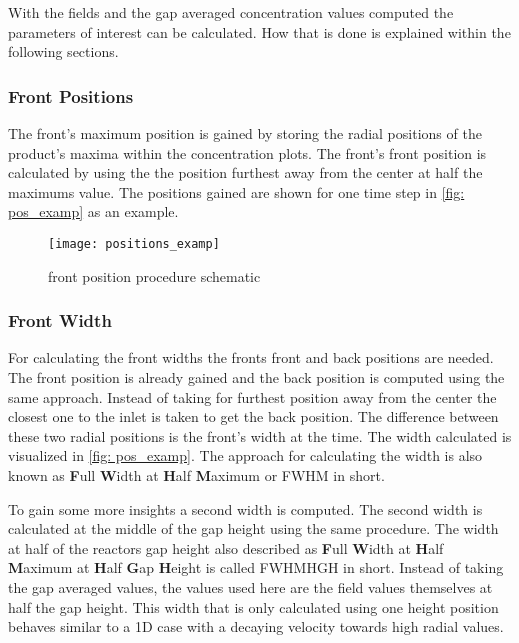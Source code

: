 \documentclass[../thesis.tex]{subfiles}
\begin{document}
With the fields and the gap averaged concentration values computed the parameters of interest can be calculated. How that is done is explained within the following sections.

\subsubsection{Front Positions}

The front's maximum position is gained by storing the radial positions of the product's maxima within the concentration plots. The front's front position is calculated by using the the position furthest away from the center at half the maximums value. The positions gained are shown for one time step in \autoref{fig: pos_examp} as an example.

\begin{figure}[htb]
	\centering
	\texttt{[image: positions\_examp]}
	\caption{front position procedure schematic}
	\label{fig: pos_examp}
\end{figure}

\subsubsection{Front Width}

For calculating the front widths the fronts front and back positions are needed. The front position is already gained and the back position is computed using the same approach. Instead of taking for furthest position away from the center the closest one to the inlet is taken to get the back position. The difference between these two radial positions is the front's width at the time. The width calculated is visualized in \autoref{fig: pos_examp}. The approach for calculating the width is also known as \textbf{F}ull \textbf{W}idth at \textbf{H}alf \textbf{M}aximum or FWHM in short.

To gain some more insights a second width is computed. The second width is calculated at the middle of the gap height using the same procedure. The width at half of the reactors gap height also described as \textbf{F}ull \textbf{W}idth at \textbf{H}alf \textbf{M}aximum at \textbf{H}alf \textbf{G}ap \textbf{H}eight is called FWHMHGH in short. Instead of taking the gap averaged values, the values used here are the field values themselves at half the gap height. This width that is only calculated using one height position behaves similar to a 1D case with a decaying velocity towards high radial values.
\end{document}
